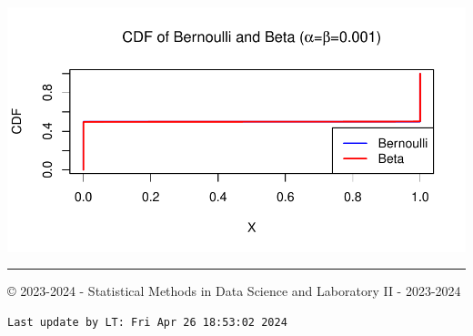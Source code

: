 \documentclass[
]{article}
\begin{document}
\begin{center}\includegraphics{Homework-01-rmd-for-SMDS-2023-2024_files/figure-latex/unnamed-chunk-29-1} \end{center}

\begin{center}\rule{0.5\linewidth}{0.5pt}\end{center}

© 2023-2024 - Statistical Methods in Data Science and Laboratory II -
2023-2024

\begin{verbatim}
Last update by LT: Fri Apr 26 18:53:02 2024
\end{verbatim}
\end{document}
